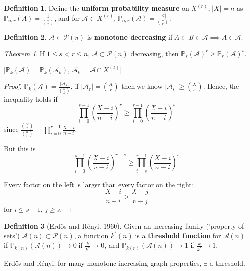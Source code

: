 \documentclass[a4paper]{article}
\theoremstyle{definition}
\newtheorem*{definition}{Definition}
\theoremstyle{remark}
\theoremstyle{default}
\newtheorem{theorem}{Theorem}
\newcommand*\abs[1]{\left|#1\right|}
\begin{document}
\begin{definition}
	Define the \textbf{uniform probability measure} on $X^{(r)}$, $\abs{X}=n$ as $\mathbb{P}_{n,r}(A) = \frac{1}{{n \choose r}}$, and for $\mathcal{A} \subset X^{(r)}$, $\mathbb{P}_{n,r}(\mathcal{A}) = \frac{\abs{\mathcal{A}}}{{n \choose r}}$.
\end{definition}

\begin{definition}
	$\mathcal{A} \subset \mathcal{P}(n)$ is \textbf{monotone decreasing} if $A \subset B \in \mathcal{A} \implies A \in \mathcal{A}$.
\end{definition}

\begin{theorem}
	If $1 \leq s < r \leq n$, $\mathcal{A} \subset \mathcal{P}(n)$ decreasing,
	then $\mathbb{P}_s(\mathcal{A})^r \geq \mathbb{P}_r(\mathcal{A})^s$.
	
	[$\mathbb{P}_k(\mathcal{A}) = \mathbb{P}_k(\mathcal{A}_k)$, $\mathcal{A}_k = \mathcal{A} \cap X^{(k)}$]
\end{theorem}
\begin{proof}
	$\mathbb{P}_k(\mathcal{A}) = \frac{\abs{\mathcal{A}_k}}{{n \choose k}}$,
	if $\abs{\mathcal{A}_r}={X \choose r}$ then we know $\abs{\mathcal{A}_s} \geq {X \choose s}$.
	Hence, the inequality holds if
	$$\prod_{i=0}^{s-1} \left(\frac{X-i}{n-i}\right)^r \geq \prod_{i=0}^{r-1} \left(\frac{X-i}{n-i}\right)^s$$
	since $\frac{{X \choose r}}{{n \choose r}} = \prod_{i=0}^{r-1}\frac{X-i}{n-i}$.
	
	But this is
	$$\prod_{i=0}^{s-1} \left(\frac{X-i}{n-i}\right)^{r-s} \geq \prod_{i=s}^{r-1} \left(\frac{X-i}{n-i}\right)^s$$
	
	Every factor on the left is larger than every factor on the right:
	$$\frac{X-i}{n-i} > \frac{X-j}{n-j}$$
	for $i \leq s-1$, $j \geq s$.
\end{proof}

\begin{definition}[Erd\H{o}s and R\'enyi, 1960]
	Given an increasing family ('property of sets') $\mathcal{A}(n) \subset \mathcal{P}(n)$,
	a function $k^*(n)$ is a \textbf{threshold function} for $\mathcal{A}(n)$
	if $\mathbb{P}_{k(n)}(\mathcal{A}(n)) \to 0$ if $\frac{k}{k^*} \to 0$,
	and $\mathbb{P}_{k(n)}(\mathcal{A}(n)) \to 1$ if $\frac{k}{k^*} \to 1$.
\end{definition}

Erd\H{o}s and R\'enyi: for many monotone increasing graph properties, $\exists$ a threshold.
\end{document}
